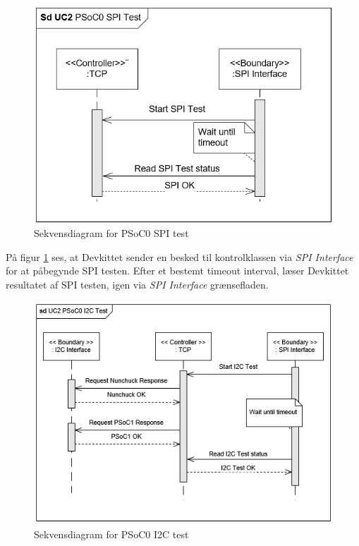 \begin{figure}[H]
	\centering
	\includegraphics[width=.8\textwidth] {Systemarkitektur/images/SDPSoC0SPITest}
	\caption{Sekvensdiagram for PSoC0 SPI test}
	\label{fig:sekvensPSoC0SPITest}
\end{figure}

På figur \ref{fig:sekvensPSoC0SPITest} ses, at Devkittet sender en besked til kontrolklassen via \textit{SPI Interface} for at påbegynde SPI testen. Efter et bestemt timeout interval, læser Devkittet resultatet af SPI testen, igen via \textit{SPI Interface} grænsefladen.

\begin{figure}[H]
	\centering
	\includegraphics[width=\textwidth] {Systemarkitektur/images/SDPSoC0I2CTest}
	\caption{Sekvensdiagram for PSoC0 I2C test}
	\label{fig:sekvensPSoC0I2CTest}
\end{figure}

